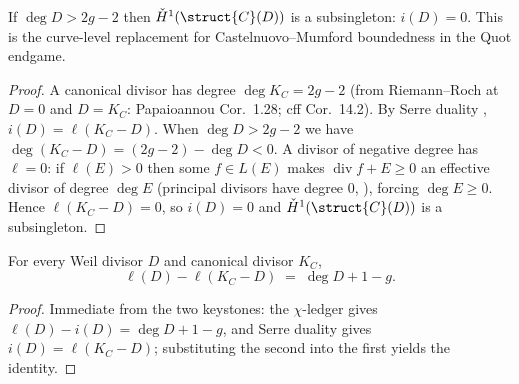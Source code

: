 \begin{corollary}
[Vanishing: \(i(D) = 0\) for \(\deg D > 2g - 2\)]
  \label{thm:adelic_h1_vanishing}
  If \(\deg D > 2g - 2\) then \(\check{H}^1(\struct{C}(D))\) is a
  subsingleton: \(i(D) = 0\). This is the curve-level replacement for
  Castelnuovo--Mumford boundedness in the Quot endgame.
\end{corollary}
\begin{proof}
  A canonical divisor has degree \(\deg K_C = 2g - 2\)
  (from Riemann--Roch at \(D = 0\) and \(D = K_C\): Papaioannou Cor.~1.28;
  cff Cor.~14.2). By Serre duality ,
  \(i(D) = \ell(K_C - D)\). When \(\deg D > 2g - 2\) we have
  \(\deg(K_C - D) = (2g - 2) - \deg D < 0\). A divisor of negative degree
  has \(\ell = 0\): if \(\ell(E) > 0\) then some \(f \in L(E)\) makes
  \(\operatorname{div} f + E \ge 0\) an effective divisor of degree
  \(\deg E\) (principal divisors have degree \(0\),
  ), forcing \(\deg E \ge 0\).
  Hence \(\ell(K_C - D) = 0\), so \(i(D) = 0\) and
  \(\check{H}^1(\struct{C}(D))\) is a subsingleton.
\end{proof}

\begin{theorem}
  \label{thm:adelic_riemannRoch}
  For every Weil divisor \(D\) and canonical divisor \(K_C\),
  \[
    \ell(D) - \ell(K_C - D) \;=\; \deg D + 1 - g .
  \]
\end{theorem}
\begin{proof}
  Immediate from the two keystones: the \(\chi\)-ledger
   gives
  \(\ell(D) - i(D) = \deg D + 1 - g\), and Serre duality
   gives \(i(D) = \ell(K_C - D)\);
  substituting the second into the first yields the identity.
\end{proof}
